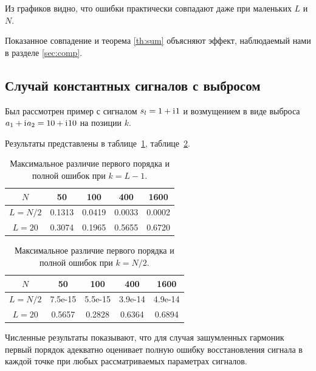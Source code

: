 \documentclass[specialist,
               substylefile = spbu.rtx,
               subf,href,colorlinks=true, 12pt]{disser}
\begin{document}
Из графиков видно, что ошибки практически совпадают даже при маленьких $L$ и $N$.

Показанное совпадение и теорема \ref{th:sum} объясняют эффект, наблюдаемый нами в разделе \ref{sec:comp}.

\subsection{Случай константных сигналов с выбросом}

Был рассмотрен пример с сигналом $s_l = 1 + \mathrm{i}\mkern1mu 1$ и возмущением в виде выброса $a_1 + \mathrm{i}\mkern1mu a_2 = 10 + \mathrm{i}\mkern1mu 10$ на позиции $k$. 

Результаты представлены в таблице~\ref{tab:const_outl_1}, таблице~\ref{tab:const_outl_2}.

\begin{table}[H]
	\begin{center}
		\caption{Максимальное различие первого порядка и полной ошибок при $k = L - 1$.}
		\label{tab:const_outl_1}
		\begin{tabular}{|c|c|c|c|c|}
			\hline
			$N$	& 50 & 100 & 400 & 1600 \\
			\hline
			$L = N / 2$ & 0.1313  & 0.0419  & 0.0033 & 0.0002 \\
			\hline
			$L = 20$ & 0.3074  & 0.1965  & 0.5655 & 0.6720 \\
			\hline
		\end{tabular}
	\end{center}
\end{table}

\begin{table}[H]
	\begin{center}
		\caption{Максимальное различие первого порядка и полной ошибок при $k = N / 2$.}
		\label{tab:const_outl_2}
		\begin{tabular}{|c|c|c|c|c|}
			\hline
			$N$	& 50 & 100 & 400 & 1600 \\
			\hline
			$L = N / 2$ & 7.5e-15  & 5.5e-15  & 3.9e-14 & 4.9e-14 \\
			\hline
			$L = 20$ & 0.5657  & 0.2828  & 0.6364 & 0.6894 \\
			\hline
		\end{tabular}
	\end{center}
\end{table}

Численные результаты показывают, что для случая зашумленных гармоник первый порядок адекватно оценивает полную ошибку восстановления сигнала в каждой точке при любых рассматриваемых параметрах сигналов.
\end{document}

